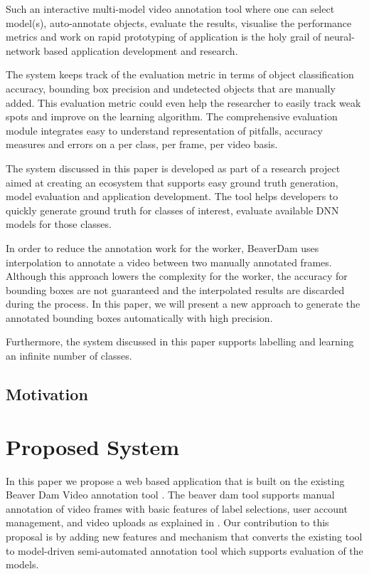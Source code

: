 \documentclass[conference]{IEEEtran}
\begin{document}
Such an interactive multi-model video annotation tool where one can select model(s), auto-annotate objects, evaluate the results, visualise the performance metrics and work on rapid prototyping of application is the holy grail of neural-network based application development and research.\par
The system keeps track of the evaluation metric in terms of object classification accuracy, bounding box precision and undetected objects that are manually added. This evaluation metric could even help the researcher to easily track weak spots and improve on the learning algorithm. The comprehensive evaluation module integrates easy to understand representation of pitfalls, accuracy measures and errors on a per class, per frame, per video basis. \par
The system discussed in this paper is developed as part of a research project aimed at creating an ecosystem that supports easy ground truth generation, model evaluation and application development. The tool helps developers to quickly generate ground truth for classes of interest, evaluate available DNN models for those classes. \par
In order to reduce the annotation work for the worker, BeaverDam uses interpolation to annotate a video between two manually annotated frames. Although this approach lowers the complexity for the worker, the accuracy for bounding boxes are not guaranteed and the interpolated results are discarded during the process. In this paper, we will present a new approach to generate the annotated bounding boxes automatically with high precision.\par
Furthermore, the system discussed in this paper supports labelling and learning an infinite number of classes.  \par

\subsection{Motivation}

\section{Proposed System}\label{sec.overview}
In this paper we propose a web based application that is built on the existing Beaver Dam Video annotation tool \cite{dominguez2014gtgencv}.  
The beaver dam tool supports manual annotation of video frames with basic features of label selections, user account management, and video uploads as explained in \cite{dominguez2014gtgencv}. 
Our contribution to this proposal is by adding new features and mechanism that converts the existing tool to model-driven semi-automated annotation tool which supports evaluation of the models.
\end{document}
